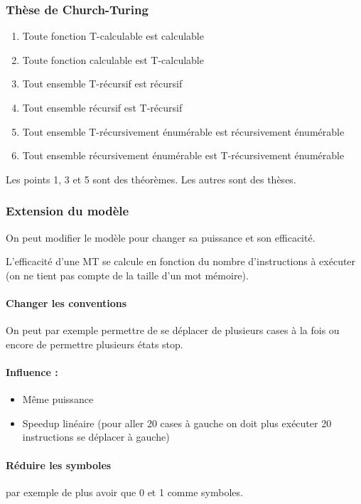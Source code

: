 \subsubsection{Thèse de Church-Turing}
\begin{enumerate}
	\item Toute fonction T-calculable est calculable
	\item Toute fonction calculable est T-calculable
	\item Tout ensemble T-récursif est récursif
	\item Tout ensemble récursif est T-récursif
	\item Tout ensemble T-récursivement énumérable est récursivement 
		énumérable
	\item Tout ensemble récursivement énumérable est T-récursivement 
		énumérable
\end{enumerate}
Les points 1, 3 et 5 sont des théorèmes. Les autres sont des thèses.

\subsubsection{Extension du modèle}
On peut modifier le modèle pour changer sa puissance et son efficacité.

\begin{mydef} L'efficacité d'une MT se calcule en 
	fonction du nombre d'instructions à exécuter (on ne tient pas compte de 
	la taille d'un mot mémoire).
\end{mydef}

\paragraph{Changer les conventions}
On peut par exemple permettre de se déplacer de plusieurs cases à la fois ou 
encore de permettre plusieurs états stop.

\paragraph{Influence :} 
\begin{itemize}
	\item Même puissance
	\item Speedup linéaire (pour aller 20 cases à gauche on doit plus 
		exécuter 20 instructions se déplacer à gauche)
\end{itemize}

\paragraph{Réduire les symboles} par exemple de plus avoir que 0 et 1 comme
symboles.

